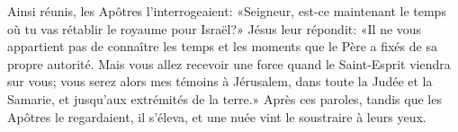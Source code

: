 Ainsi réunis, les Apôtres l’interrogeaient:
	«Seigneur, est-ce maintenant le temps où tu vas rétablir le royaume pour Israël?»
Jésus leur répondit: «Il ne vous appartient pas de connaître
		les temps et les moments que le Père a fixés de sa propre autorité.
Mais vous allez recevoir une force quand le Saint-Esprit viendra sur vous;
	vous serez alors mes témoins à Jérusalem,
	dans toute la Judée et la Samarie, et jusqu’aux extrémités de la terre.»
Après ces paroles, tandis que les Apôtres le regardaient,
	il s’éleva, et une nuée vint le soustraire à leurs yeux.
